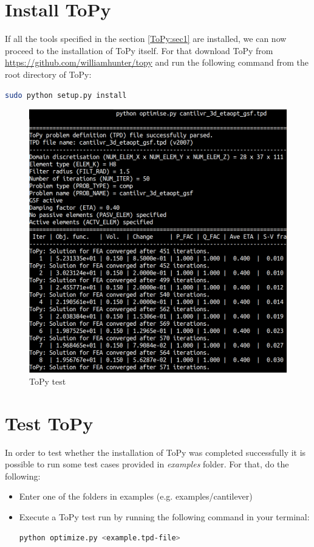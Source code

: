 \documentclass[11pt,a4paper,bibtotoc,idxtotoc,headsepline,footsepline,footexclude,DIV13,oneside]{scrbook}
\begin{document}
	\section{Install ToPy}
	If all the tools specified in the section \ref{ToPy:sec1} are installed, we can now proceed to the installation of ToPy itself. For that download ToPy from \href{https://github.com/williamhunter/topy}{https://github.com/williamhunter/topy}  and run the following command from the root directory of ToPy:
\begin{lstlisting}[language=bash]
sudo python setup.py install
\end{lstlisting}	
	\begin{figure}
	\centering
	\includegraphics[scale=0.2]{img/ToPy_ExampleRun.png}
	\caption{ToPy test}
	\label{fig:ToPy_test}
	\end{figure}


	\section{Test ToPy}
	In order to test whether the installation of ToPy was completed successfully it is possible to run some test cases provided in \textit{examples} folder. For that, do the following:
	\begin{itemize}
	\item Enter one of the folders in examples (e.g. examples/cantilever)
	\item Execute a ToPy test run by running the following command in your terminal:
\begin{lstlisting}[language=bash]
python optimize.py <example.tpd-file>
\end{lstlisting}	
	\end{itemize}
	
\end{document}
